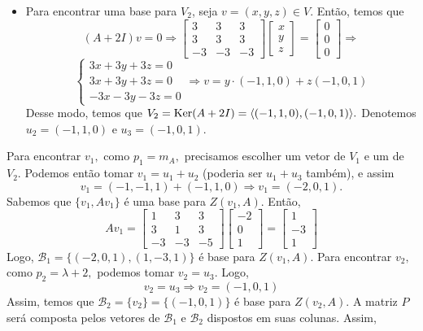 \documentclass[11pt,a4paper]{article}
\begin{document}
{\begin{itemize}
\item Para encontrar uma base para $V_2$, seja $v = (x, y, z) \in V.$ Então, temos que
    \[
    (A + 2I)v = 0 \Rightarrow \begin{bmatrix}
3 & 3 & 3 \\
3 & 3 & 3 \\
-3 & -3 & -3
\end{bmatrix} \begin{bmatrix}
x \\ y \\ z
\end{bmatrix} = \begin{bmatrix}
0 \\ 0 \\ 0
\end{bmatrix} \Rightarrow \]\[\begin{cases}
3x + 3y + 3z = 0 \\
3x+3y+3z = 0 \\
-3x-3y-3z = 0
\end{cases} \Rightarrow v = y \cdot (-1,1,0) + z (-1,0,1)
    \]
        Desse modo, temos que $V_2 = \operatorname{Ker}(A + 2I) = \langle (-1,1,0), (-1,0,1) \rangle.$ Denotemos $u_2 = (-1,1,0)$ e $u_3 =  (-1,0,1).$ 
\end{itemize}
Para encontrar $v_1,$ como $p_1 = m_A,$ precisamos escolher um vetor de $V_1$ e um de $V_2.$ Podemos então tomar $v_1 = u_1 + u_2$ (poderia ser $u_1 + u_3$ também), e assim
\[
v_1 = (-1,-1,1) + (-1,1,0) \Rightarrow v_1 = (-2,0,1).
\]
Sabemos que $\{ v_1, Av_1 \}$ é uma base para $Z(v_1, A).$ Então,
\[
Av_ 1 =  \begin{bmatrix}
1 & 3 & 3 \\
3 & 1 & 3 \\
-3 & -3 & -5
\end{bmatrix} \begin{bmatrix}
-2 \\ 0 \\ 1
\end{bmatrix} = \begin{bmatrix}
1 \\ -3 \\ 1
\end{bmatrix}
\]
Logo, $\mathcal{B_1} = \{ (-2,0,1),(1, -3 , 1)\} $ é base para $Z(v_1, A).$
Para encontrar $v_2,$ como $p_2 = \lambda + 2,$ podemos tomar $v_2 = u_3.$ Logo,
\[
v_2 = u_3 \Rightarrow v_2 =  (-1,0,1)
\]
Assim, temos que $\mathcal{B}_2 = \{v_2 \} = \{ (-1,0,1) \}$ é base para $Z(v_2, A).$ A matriz $P$ será composta pelos vetores de $\mathcal{B}_1$ e $\mathcal{B}_2$ dispostos em suas colunas. Assim,
}
\end{document}
